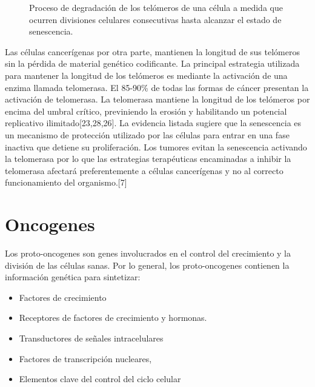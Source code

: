 \begin{figure}[!ht]
\begin{center}
\end{center}\vspace*{-0.6cm}
\caption[Proceso de degradaci\'on de los tel\'omeros de una c\'elula]{Proceso de degradaci\'on de los tel\'omeros de una c\'elula a medida que ocurren divisiones celulares consecutivas hasta alcanzar el estado de senescencia.}
\label{fig-telomero}
\end{figure}

\hspace{.1cm}Las células cancerígenas por otra parte, mantienen la longitud de sus telómeros sin la pérdida de material genético codificante. La principal estrategia utilizada para mantener la longitud de los telómeros es mediante la activación de una enzima llamada telomerasa. El 85-90\% de todas las formas de cáncer presentan la activación de telomerasa. La telomerasa mantiene la longitud de los telómeros por encima del umbral crítico, previniendo la erosión y habilitando un potencial replicativo ilimitado[23,28,26]. La evidencia listada sugiere que la senescencia es un mecanismo de protección utilizado por las células para entrar en una fase inactiva que detiene su proliferación. Los tumores evitan la senescencia activando la telomerasa por lo que las estrategias terapéuticas encaminadas a inhibir la telomerasa afectará preferentemente a células cancerígenas y no al correcto funcionamiento del organismo.[7]

\section{Oncogenes}
\hspace{.1cm}Los proto-oncogenes son genes involucrados en el control del crecimiento y la división de las células sanas. Por lo general, los proto-oncogenes contienen la información genética para sintetizar:
\begin{itemize}
    \item Factores de crecimiento
    \item Receptores de factores de crecimiento y hormonas.
    \item Transductores de señales intracelulares
    \item Factores de transcripción nucleares,
    \item Elementos clave del control del ciclo celular
\end{itemize}

